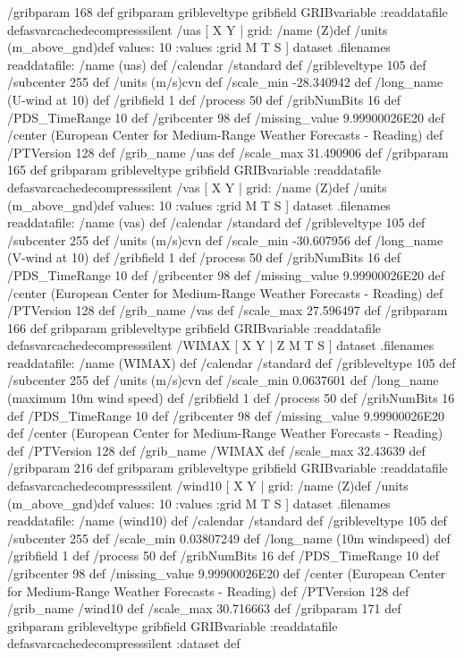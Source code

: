 \begin{ingrid}
{{ /gribparam 168 def
 gribparam gribleveltype gribfield GRIBvariable
 :readdatafile
}defasvarcachedecompresssilent
 /uas{
[ X Y | grid:
/name (Z)def
/units (m_above_gnd)def
values: 10 :values
:grid
 M T S ] dataset .filenames readdatafile:
/name (uas) def
 /calendar /standard def
 /gribleveltype 105 def
 /subcenter 255 def
 /units (m/s)cvn def
 /scale_min -28.340942 def
 /long_name (U-wind at 10) def
 /gribfield 1 def
 /process 50 def
 /gribNumBits 16 def
 /PDS_TimeRange 10 def
 /gribcenter 98 def
 /missing_value 9.99900026E20 def
 /center (European Center for Medium-Range Weather Forecasts - Reading) def
 /PTVersion 128 def
 /grib_name /uas def
 /scale_max 31.490906 def
 /gribparam 165 def
 gribparam gribleveltype gribfield GRIBvariable
 :readdatafile
}defasvarcachedecompresssilent
 /vas{
[ X Y | grid:
/name (Z)def
/units (m_above_gnd)def
values: 10 :values
:grid
 M T S ] dataset .filenames readdatafile:
/name (vas) def
 /calendar /standard def
 /gribleveltype 105 def
 /subcenter 255 def
 /units (m/s)cvn def
 /scale_min -30.607956 def
 /long_name (V-wind at 10) def
 /gribfield 1 def
 /process 50 def
 /gribNumBits 16 def
 /PDS_TimeRange 10 def
 /gribcenter 98 def
 /missing_value 9.99900026E20 def
 /center (European Center for Medium-Range Weather Forecasts - Reading) def
 /PTVersion 128 def
 /grib_name /vas def
 /scale_max 27.596497 def
 /gribparam 166 def
 gribparam gribleveltype gribfield GRIBvariable
 :readdatafile
}defasvarcachedecompresssilent
 /WIMAX{
[ X Y | Z M T S ] dataset .filenames readdatafile:
/name (WIMAX) def
 /calendar /standard def
 /gribleveltype 105 def
 /subcenter 255 def
 /units (m/s)cvn def
 /scale_min 0.0637601 def
 /long_name (maximum 10m wind speed) def
 /gribfield 1 def
 /process 50 def
 /gribNumBits 16 def
 /PDS_TimeRange 10 def
 /gribcenter 98 def
 /missing_value 9.99900026E20 def
 /center (European Center for Medium-Range Weather Forecasts - Reading) def
 /PTVersion 128 def
 /grib_name /WIMAX def
 /scale_max 32.43639 def
 /gribparam 216 def
 gribparam gribleveltype gribfield GRIBvariable
 :readdatafile
}defasvarcachedecompresssilent
 /wind10{
[ X Y | grid:
/name (Z)def
/units (m_above_gnd)def
values: 10 :values
:grid
 M T S ] dataset .filenames readdatafile:
/name (wind10) def
 /calendar /standard def
 /gribleveltype 105 def
 /subcenter 255 def
 /scale_min 0.03807249 def
 /long_name (10m windspeed) def
 /gribfield 1 def
 /process 50 def
 /gribNumBits 16 def
 /PDS_TimeRange 10 def
 /gribcenter 98 def
 /missing_value 9.99900026E20 def
 /center (European Center for Medium-Range Weather Forecasts - Reading) def
 /PTVersion 128 def
 /grib_name /wind10 def
 /scale_max 30.716663 def
 /gribparam 171 def
 gribparam gribleveltype gribfield GRIBvariable
 :readdatafile
}defasvarcachedecompresssilent
:dataset
} def
\end{ingrid}

